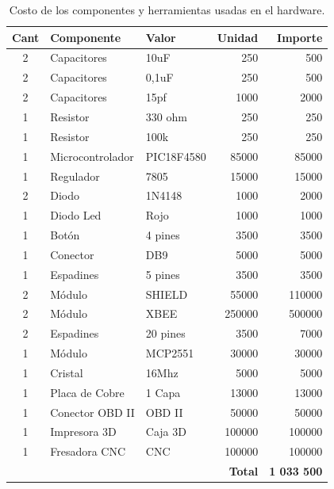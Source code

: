 \begin{table}[H]
\begin{center}
\begin{tabular}{|c|l|l|r|r|}
\hline
\textbf{Cant} & \textbf{Componente} & \textbf{Valor} &\textbf{Unidad}&\textbf{Importe}  \\ \hline

2    & Capacitores      & 10uF        & 250            & 500   \\ \hline
2    & Capacitores      & 0,1uF       & 250            & 500   \\ \hline
2    & Capacitores      & 15pf        & 1000           & 2000  \\ \hline
1    & Resistor         & 330 ohm     & 250            & 250   \\ \hline
1    & Resistor         & 100k        & 250            & 250   \\ \hline
1    & Microcontrolador &PIC18F4580   & 85000          & 85000 \\ \hline
1    & Regulador        & 7805        & 15000          & 15000 \\ \hline
2    & Diodo            & 1N4148      & 1000           & 2000  \\ \hline
1    & Diodo Led        & Rojo        & 1000           & 1000  \\ \hline
1    & Botón            & 4 pines    & 3500           & 3500  \\ \hline
1    & Conector        & DB9    & 5000           & 5000  \\ \hline
1    & Espadines       & 5 pines   & 3500           & 3500  \\ \hline
2    & Módulo          & SHIELD & 55000          & 110000 \\ \hline
2    & Módulo          & XBEE        & 250000         & 500000 \\ \hline
2    & Espadines       & 20 pines  & 3500           & 7000    \\ \hline
1    & Módulo          & MCP2551     & 30000          & 30000  \\ \hline
1    & Cristal         & 16Mhz     & 5000           & 5000   \\ \hline
1    & Placa de Cobre  & 1 Capa      & 13000          & 13000   \\ \hline
1    & Conector OBD II  & OBD II     & 50000          & 50000   \\ \hline
1    & Impresora 3D         & Caja 3D       & 100000         & 100000 \\ \hline
1    & Fresadora CNC    & CNC        & 100000         & 100000 \\ \hline
     &                  &            & \textbf{Total} & \textbf{1 033 500}  \\ \hline

\end{tabular}
\caption{Costo de los componentes y herramientas usadas en el hardware.}
\label{tabla:hw}
\end{center}
\end{table}

